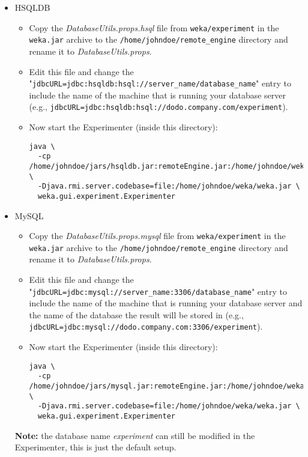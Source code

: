 \begin{itemize}
	\item HSQLDB
		\begin{itemize}
   		\item Copy the \textit{DatabaseUtils.props.hsql} file from \texttt{weka/experiment} in the \texttt{weka.jar} archive to the \texttt{/home/johndoe/remote\_engine} directory and rename it to \textit{DatabaseUtils.props}.
		   \item Edit this file and change the "\small{\texttt{jdbcURL=jdbc:hsqldb:hsql://server\_name/database\_name}}" entry to include the name of the machine that is running your database server (e.g., \small{\texttt{jdbcURL=jdbc:hsqldb:hsql://dodo.company.com/experiment}}).
		   \item Now start the Experimenter (inside this directory): 
				\small{\begin{verbatim}
java \
  -cp /home/johndoe/jars/hsqldb.jar:remoteEngine.jar:/home/johndoe/weka/weka.jar \
  -Djava.rmi.server.codebase=file:/home/johndoe/weka/weka.jar \
  weka.gui.experiment.Experimenter
				\end{verbatim}}
		\end{itemize}

	\item MySQL
		\begin{itemize}
   		\item Copy the \textit{DatabaseUtils.props.mysql} file from \texttt{weka/experiment} in the \texttt{weka.jar} archive to the \texttt{/home/johndoe/remote\_engine} directory and rename it to \textit{DatabaseUtils.props}.
		   \item Edit this file and change the "\small{\texttt{jdbcURL=jdbc:mysql://server\_name:3306/database\_name}}" entry to include the name of the machine that is running your database server and the name of the database the result will be stored in (e.g., \small{\texttt{jdbcURL=jdbc:mysql://dodo.company.com:3306/experiment}}). 
		   \item Now start the Experimenter (inside this directory): 
				\small{\begin{verbatim}
java \
  -cp /home/johndoe/jars/mysql.jar:remoteEngine.jar:/home/johndoe/weka/weka.jar \
  -Djava.rmi.server.codebase=file:/home/johndoe/weka/weka.jar \
  weka.gui.experiment.Experimenter
				\end{verbatim}}
		\end{itemize}
		
		\textbf{Note:} the database name \textit{experiment} can still be modified in the Experimenter, this is just the default setup.
\end{itemize}

